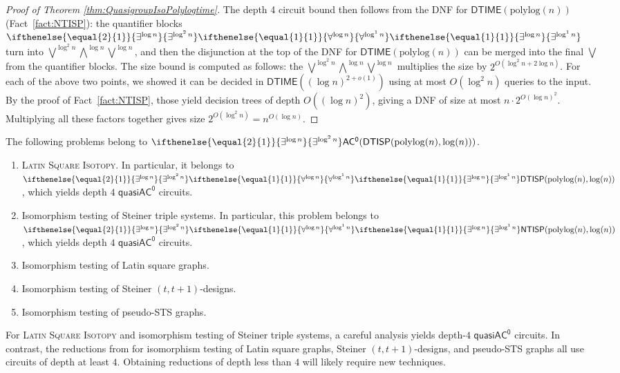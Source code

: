 \documentclass{article}
\newcommand{\algprobm}[1]{\textsc{#1}\xspace}
\newcommand{\betacc}[1]{\ifthenelse{\equal{#1}{1}}{\exists^{\log n}}{\exists^{\log^{#1}n}}} %
\newcommand{\alphacc}[1]{\ifthenelse{\equal{#1}{1}}{\forall^{\log n}}{\forall^{\log^{#1}n}}} %
\newcommand{\Oh}{O}
\newcommand*{\ComplexityClass}[1]{\ensuremath{\mathsf{#1}}\xspace}
\newcommand{\NTISP}{\ComplexityClass{NTISP}}
\newcommand{\DTISP}{\ComplexityClass{DTISP}}
\newcommand{\NTISPpll}{\ensuremath{\NTISP(\mathrm{polylog}(n),\mathrm{log}(n))}\xspace}
\newcommand{\DTISPpll}{\ensuremath{\DTISP(\mathrm{polylog}(n),\mathrm{log}(n))}\xspace}
\newcommand{\ACz}{\ComplexityClass{AC^0}}
\newcommand{\qACz}{\ComplexityClass{quasiAC^0}}
\newcommand{\DTIME}{\ComplexityClass{DTIME}}
\begin{document}
\begin{proof}[Proof of Theorem \ref{thm:QuasigroupIsoPolylogtime}]
The depth 4 circuit bound then follows from the DNF for $\DTIME(\text{polylog}(n))$ (Fact~\ref{fact:NTISP}): the quantifier blocks $\betacc{2}\alphacc{1}\betacc{1}$ turn into $\bigvee^{\log^2 n} \bigwedge^{\log n} \bigvee^{\log n}$, and then the disjunction at the top of the DNF for $\DTIME(\text{polylog}(n))$ can be merged into the final $\bigvee$ from the quantifier blocks. The size bound is computed as follows: the $\bigvee^{\log^2 n} \bigwedge^{\log n} \bigvee^{\log n}$ multiplies the size by $2^{\Oh(\log^2 n + 2 \log n)}$. For each of the above two points, we showed it can be decided in $\mathsf{DTIME}((\log n)^{2 + o(1)})$ using at most $\Oh(\log^2 n)$ queries to the input. By the proof of Fact~\ref{fact:NTISP}, those yield decision trees of depth $\Oh((\log n)^2)$, giving a DNF of size at most $n \cdot 2^{\Oh(\log n)^2}$. Multiplying all these factors together gives size $2^{\Oh(\log^2 n)} = n^{\Oh(\log n)}$.
\end{proof}

\begin{corollary} \label{cor:SRGs}
The following problems belong to $\betacc{2}\ACz(\DTISPpll)$.
\begin{enumerate}[label=(\alph*)]
\item \algprobm{Latin Square Isotopy}. In particular, it belongs to \\ $\betacc{2}\alphacc{1}\betacc{1}\DTISPpll$, which yields depth $4$ $\qACz$ circuits.

\item Isomorphism testing of Steiner triple systems. In particular, this problem belongs to \\ $\betacc{2}\alphacc{1}\betacc{1}\NTISPpll$, which yields depth $4$ $\qACz$ circuits.


\item Isomorphism testing of Latin square graphs.
\item Isomorphism testing of Steiner $(t, t+1)$-designs.
\item Isomorphism testing of pseudo-STS graphs.
\end{enumerate}
\end{corollary}

\noindent For \algprobm{Latin Square Isotopy} and isomorphism testing of Steiner triple systems, a careful analysis yields depth-$4$ $\qACz$ circuits. In contrast, the reductions from \cite{LevetLatinSquares} for isomorphism testing of Latin square graphs, Steiner $(t, t+1)$-designs, and pseudo-STS graphs all use circuits of depth at least $4$. Obtaining reductions of depth less than $4$ will likely require new techniques.
\end{document}
